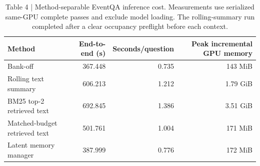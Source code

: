 \begin{table}[t]
\centering
\begin{tabular}{lrrr}
\toprule
Method & End-to-end (s) & Seconds/question & Peak incremental GPU memory \\
\midrule
Bank-off & 367.448 & 0.735 & 143 MiB \\
Rolling text summary & 606.213 & 1.212 & 1.79 GiB \\
BM25 top-2 retrieved text & 692.845 & 1.386 & 3.51 GiB \\
Matched-budget retrieved text & 501.761 & 1.004 & 171 MiB \\
Latent memory manager & 387.999 & 0.776 & 172 MiB \\
\bottomrule
\end{tabular}
\caption{Table 4 | Method-separable EventQA inference cost. Measurements use serialized same-GPU complete passes and exclude model loading. The rolling-summary run completed after a clear occupancy preflight before each context.}
\label{tab:efficiency-analysis}
\end{table}
